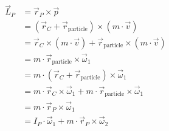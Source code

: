     \begin{solution}
        \begin{center}
        \end{center}
    
        \begin{align*}
            \vec{L}_P &= \vec{r}_P \times \vec{p} \\
                      &= (\vec{r}_C + \vec{r}_{\text{particle}}) \times (m \cdot \vec{v}) \\
                      &= \vec{r}_C \times (m \cdot \vec{v}) + \vec{r}_{\text{particle}} \times (m \cdot \vec{v}) \\
                      &= m \cdot \vec{r}_{\text{particle}} \times \vec{\omega}_1 \\
                      &= m \cdot (\vec{r}_C + \vec{r}_{\text{particle}}) \times \vec{\omega}_1 \\
                      &= m \cdot \vec{r}_C \times \vec{\omega}_1 + m \cdot \vec{r}_{\text{particle}} \times \vec{\omega}_1 \\
                      &= m \cdot \vec{r}_P \times \vec{\omega}_1 \\
                      &= I_P \cdot \vec{\omega}_1 + m \cdot \vec{r}_P \times \vec{\omega}_2
            \end{align*}


\end{solution}
